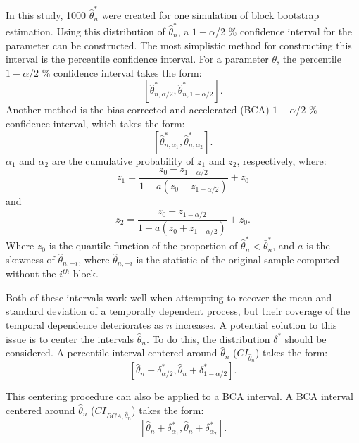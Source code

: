 \documentclass[12pt, letterpaper, titlepage]{article}
\begin{document}
In this study, 1000 $\hat\theta_n^*$ were created for one simulation of block bootstrap estimation. Using this distribution of $\hat\theta_n^*$, a $1 - \alpha$/2 \% confidence interval for the parameter can be constructed. The most simplistic method for constructing this interval is the percentile confidence interval. For a parameter $\theta$, the percentile $1 - \alpha$/2 \% confidence interval takes the form: 
\[ [\hat\theta_{n, \alpha/2}^*, \hat\theta_{n, 1 - \alpha/2}^*].\] 
Another method is the bias-corrected and accelerated 
(BCA) $1 - \alpha$/2 \% confidence interval, which takes the form: 
\[ [\hat\theta_{n, \alpha_1}^*,\hat\theta_{n, \alpha_2}^*].\] 
$\alpha_{1}$ and $\alpha_{2}$ are the cumulative probability of $z_{1}$ and $z_{2}$, respectively, where:
\[z_{1} = \frac{z_{0} - z_{1 - \alpha/2}}{1 - a(z_{0} - z_{1 - \alpha/2})} + z_{0}\] and
\[z_{2} = \frac{z_{0} + z_{1 - \alpha/2}}{1 - a(z_{0} + z_{1 - \alpha/2})} + z_{0}.\] 
Where $z_0$ is the quantile function of the proportion of $\hat\theta_n^* < \bar\theta_n^*$, and $a$ is the skewness of $\hat{\theta}_{n, -i}$, where $\hat{\theta}_{n, -i}$ is the statistic of the original sample computed without the $i^{th}$ block.
	
	Both of these intervals work well when attempting to recover the mean and standard deviation of a temporally dependent process, but their coverage of the temporal dependence deteriorates as $n$ increases. A potential solution to this issue is to center the intervals $\hat{\theta}_{n}$. To do this, the distribution $\delta^*$ should be considered. A percentile interval centered around $\hat{\theta}_{n}$ ($CI_{\hat{\theta}_{n}}$) takes the form:
\[ [\hat{\theta}_{n} + \delta^*_{\alpha/2}, \hat{\theta}_{n} + \delta^*_{1 - \alpha/2}].\] 


This centering procedure can also be applied to a BCA interval. A BCA interval centered around $\hat{\theta}_{n}$ ($CI_{BCA, \hat{\theta}_{n}}$) takes the form:
\[ [\hat{\theta}_{n} + \delta^*_{\alpha_1}, \hat{\theta}_{n} + \delta^*_{\alpha_2}].\] 
\end{document}
